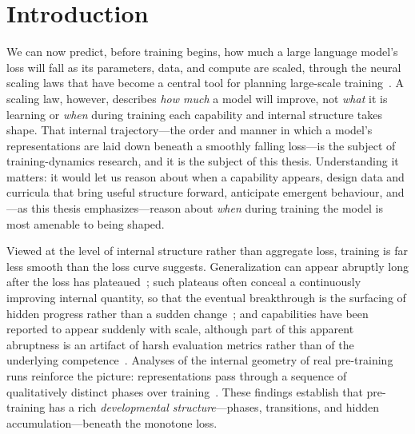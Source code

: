 \chapter{Introduction}
\label{ch:introduction}

We can now predict, before training begins, how much a large language model's loss will fall
as its parameters, data, and compute are scaled, through the neural scaling laws that have
become a central tool for planning large-scale training~\cite{kaplan2020scaling,hoffmann2022chinchilla}.
A scaling law, however, describes \emph{how much} a model will improve, not \emph{what} it is
learning or \emph{when} during training each capability and internal structure takes shape.
That internal trajectory---the order and manner in which a model's representations are laid
down beneath a smoothly falling loss---is the subject of training-dynamics research, and it is
the subject of this thesis. Understanding it matters: it would let us reason about when a
capability appears, design data and curricula that bring useful structure forward, anticipate
emergent behaviour, and---as this thesis emphasizes---reason about \emph{when} during training
the model is most amenable to being shaped.

Viewed at the level of internal structure rather than aggregate loss, training is far less
smooth than the loss curve suggests. Generalization can appear abruptly long after the loss
has plateaued~\cite{power2022grokking}; such plateaus often conceal a continuously improving
internal quantity, so that the eventual breakthrough is the surfacing of hidden progress
rather than a sudden change~\cite{barak2022hidden,nanda2023progress}; and capabilities have
been reported to appear suddenly with scale, although part of this apparent abruptness is an
artifact of harsh evaluation metrics rather than of the underlying
competence~\cite{wei2022emergent,schaeffer2023mirage}. Analyses of the internal geometry of
real pre-training runs reinforce the picture: representations pass through a sequence of
qualitatively distinct phases over training~\cite{representation_geometry_phases}. These
findings establish that pre-training has a rich \emph{developmental structure}---phases,
transitions, and hidden accumulation---beneath the monotone loss.

